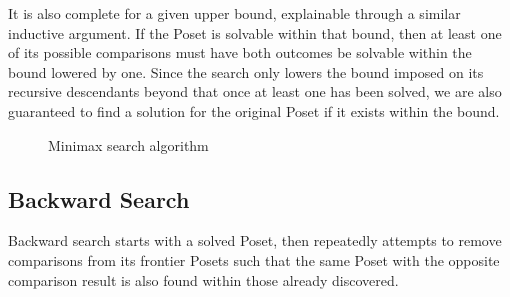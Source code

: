 \documentclass[10pt,journal,compsoc]{IEEEtran}
\begin{document}
It is also complete for a given upper bound, explainable through a similar inductive argument. If
the Poset is solvable within that bound, then at least one of its possible comparisons must have both
outcomes be solvable within the bound lowered by one. Since the search only lowers the bound imposed
on its recursive descendants beyond that once at least one has been solved, we are also guaranteed
to find a solution for the original Poset if it exists within the bound.

\begin{figure}
  \caption{Minimax search algorithm} \label{fig:minimax_search}
\end{figure}

\subsection{Backward Search}

Backward search starts with a solved Poset, then repeatedly attempts to remove comparisons from its
frontier Posets such that the same Poset with the opposite comparison result is also found within
those already discovered.
\end{document}
